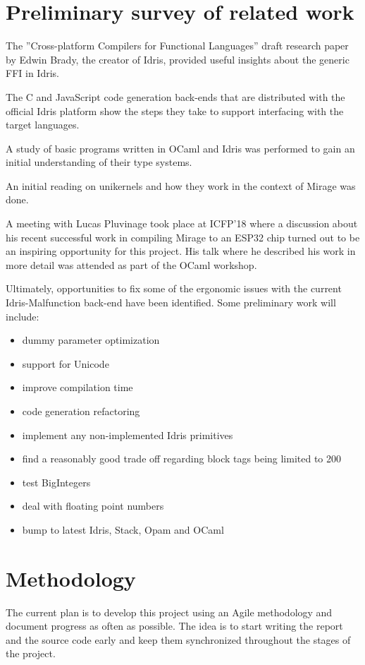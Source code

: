 \documentclass[a4paper]{report}
\begin{document}
\section{Preliminary survey of related work}
The ''Cross-platform Compilers for Functional Languages'' draft
research paper by Edwin Brady, the creator of Idris,
provided useful insights about the generic FFI in Idris.

The C and JavaScript code generation back-ends that are distributed
with the official Idris platform show the steps they take to
support interfacing with the target languages.

A study of basic programs written in OCaml and Idris was performed to gain an
initial understanding of their type systems.

An initial reading on unikernels and how they
work in the context of Mirage was done.

A meeting with Lucas Pluvinage took place at ICFP'18 where a discussion
about his recent successful work in compiling Mirage to an ESP32 chip turned
out to be an inspiring opportunity for this project.
His talk where he described his work in more detail was attended as part of the
OCaml workshop.

Ultimately, opportunities to fix some of the ergonomic issues
with the current Idris-Malfunction back-end have been
identified.
Some preliminary work will include:
\begin{itemize}
	\item dummy parameter optimization
	\item support for Unicode
	\item improve compilation time
	\item code generation refactoring
	\item implement any non-implemented Idris primitives
	\item find a reasonably good trade off regarding block
	      tags being limited to 200
	\item test BigIntegers
	\item deal with floating point numbers
	\item bump to latest Idris, Stack, Opam and OCaml
\end{itemize}


\section{Methodology}
The current plan is to develop this project using an Agile
methodology and document progress as often as possible.
The idea is to start writing the report and the source code early and keep
them synchronized throughout the stages of the project.
\end{document}
